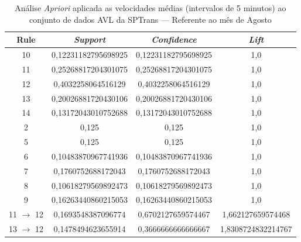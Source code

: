 \documentclass[
	12pt,				%
	oneside,			%
	a4paper,			%
	english,			%
	brazil				%
	]{abntex2ppgsi}
\begin{document}
\begin{apendicesenv}
\begin{table}[!htb]
\centering
\caption {Análise \textit{Apriori} aplicada as velocidades médias (intervalos de 5 minutos) ao conjunto de dados AVL da SPTrans --- Referente ao mês de Agosto}
\label {tab:aprioriAugust}
\begin{tabular}{c|c|c|c}
\hline
\textbf{Rule} & \textit{\textbf{Support}} & \textit{\textbf{Confidence}} & \textit{\textbf{Lift}} \\
\hline
10 &  0,12231182795698925 &  0,12231182795698925 &  1,0\\
\hline
11 &  0,25268817204301075 &  0,25268817204301075 &  1,0\\
\hline
12 &  0,4032258064516129 &  0,4032258064516129 &  1,0\\
\hline
13 &  0,20026881720430106 &  0,20026881720430106 &  1,0\\
\hline
14 &  0,13172043010752688 &  0,13172043010752688 &  1,0\\
\hline
2 &  0,125 &  0,125 &  1,0\\
\hline
5 &  0,125 &  0,125 &  1,0\\
\hline
6 &  0,10483870967741936 &  0,10483870967741936 &  1,0\\
\hline
7 &  0,1760752688172043 &  0,1760752688172043 &  1,0\\
\hline
8 &  0,10618279569892473 &  0,10618279569892473 &  1,0\\
\hline
9 &  0,16263440860215053 &  0,16263440860215053 &  1,0\\
\hline
11 $\rightarrow$ 12 &  0,1693548387096774 &  0,6702127659574467 &  1,662127659574468\\
\hline
13 $\rightarrow$ 12 &  0,1478494623655914 &  0,3666666666666667 &  1,8308724832214767\\
\hline
\end{tabular}
\end{table}


\end{apendicesenv}
\end{document}
